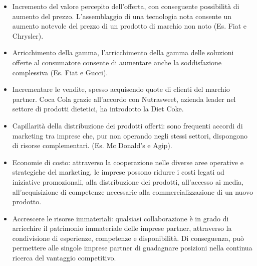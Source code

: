 \begin{itemize}
	\item Incremento del valore percepito dell’offerta, con conseguente possibilità di	aumento del prezzo. L’assemblaggio di una tecnologia nota consente un aumento notevole del prezzo di un prodotto di marchio non noto (Es. Fiat e Chrysler).
	\item Arricchimento della gamma, l’arricchimento della gamma delle soluzioni offerte al consumatore consente di aumentare anche la soddisfazione complessiva (Es. Fiat e Gucci).
	\item Incrementare le vendite, spesso acquisendo quote di clienti del marchio partner. Coca Cola grazie all’accordo con Nutrasweet, azienda leader nel settore di prodotti dietetici, ha introdotto la Diet Coke.
	\item Capillarità della distribuzione dei prodotti offerti: sono frequenti accordi di marketing tra imprese che, pur non operando negli stessi settori, dispongono di risorse complementari. (Es. Mc Donald’s e Agip).
	\item Economie di costo: attraverso la cooperazione nelle diverse aree operative e strategiche del marketing, le imprese possono ridurre i costi legati ad iniziative promozionali, alla distribuzione dei prodotti, all’accesso ai media, all’acquisizione di competenze necessarie alla commercializzazione di un nuovo prodotto.
	\item Accrescere le risorse immateriali: qualsiasi collaborazione è in grado di arricchire il patrimonio immateriale delle imprese partner, attraverso la condivisione di esperienze, competenze e disponibilità. Di conseguenza, può permettere alle singole imprese partner di guadagnare posizioni nella continua ricerca del vantaggio competitivo.
\end{itemize}
